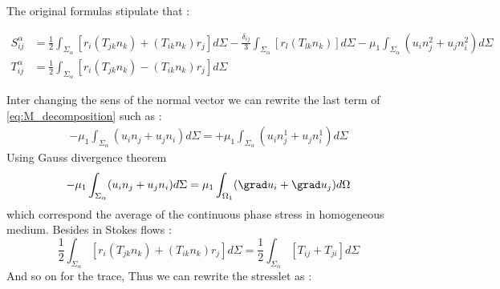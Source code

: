 The original formulas stipulate that :

\begin{align}
    \label{eq:M_decomposition}
    S^\alpha_{ij} 
    &= \frac{1}{2}  \int_{\Sigma_\alpha} \left[
        r_i(T_{jk}n_k)
        + (T_{ik}n_k)r_j
        \right]d\Sigma
        - \frac{\delta_{ij}}{3}\int_{\Sigma_\alpha} \left[
            r_l(T_{lk}n_k)
    \right]d\Sigma
    -\mu_1 \int_{\Sigma_{\alpha}}
    (u_in_j^2 + u_jn_i^2)d\Sigma
    \\
    T^\alpha_{ij}
    &= \frac{1}{2}  \int_{\Sigma_\alpha} \left[
        r_i(T_{jk}n_k)
        - (T_{ik}n_k)r_j
    \right]d\Sigma \nonumber
\end{align}

Inter changing the sens of the normal vector we can rewrite the last term of \ref{eq:M_decomposition} such as :
\begin{align}
    - \mu_1 \int_{\Sigma_{\alpha}}
    (u_in_j + u_jn_i)d\Sigma
    = 
    + \mu_1 \int_{\Sigma_{\alpha}}
    (u_i n^1_j + u_jn^1_i)d\Sigma
\end{align}
Using Gauss divergence theorem 
\begin{align}
    - \mu_1 \int_{\Sigma_{\alpha}}
    (u_in_j + u_jn_i)d\Sigma
    = 
    \mu_1 \int_{\Omega_1}
    (\grad u_i + \grad u_j )d\Omega
\end{align}
which correspond the average of the continuous phase stress in homogeneous medium.
Besides in Stokes flows :
\begin{equation}
    \frac{1}{2}  \int_{\Sigma_\alpha} \left[
        r_i(T_{jk}n_k)
        + (T_{ik}n_k)r_j
        \right]d\Sigma
    =
    \frac{1}{2}  \int_{\Sigma_\alpha} \left[
        T_{ij}
        + T_{ji}
        \right]d\Sigma
\end{equation}
And so on for the trace, Thus we can rewrite the stresslet as : 
